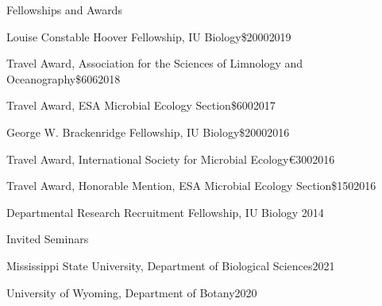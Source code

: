 \documentclass{resume} %
\begin{document}
\begin{rSection}{Fellowships and Awards}

\begin{Award}{Louise Constable Hoover Fellowship, IU Biology}{\$2000}{2019}
\end{Award}

\begin{Award}{Travel Award, Association for the Sciences of Limnology and Oceanography}{\$606}{2018}
\end{Award}

\begin{Award}{Travel Award, ESA Microbial Ecology Section}{\$600}{2017}
\end{Award}

\begin{Award}{George W. Brackenridge Fellowship, IU Biology}{\$2000}{2016}
\end{Award}

\begin{Award}{Travel Award, International Society for Microbial Ecology}{\euro{}300}{2016}
\end{Award}

\begin{Award}{Travel Award, Honorable Mention, ESA Microbial Ecology Section}{\$150}{2016}
\end{Award}

\begin{Award}{Departmental Research Recruitment Fellowship, IU Biology}{ }{2014}
\end{Award}

\end{rSection}

\bigskip
\begin{rSection}{Invited Seminars}
\begin{Seminar}{Mississippi State University, Department of Biological Sciences}{2021}\end{Seminar}
\begin{Seminar}{University of Wyoming, Department of Botany}{2020}\end{Seminar}
\end{rSection}
\end{document}
